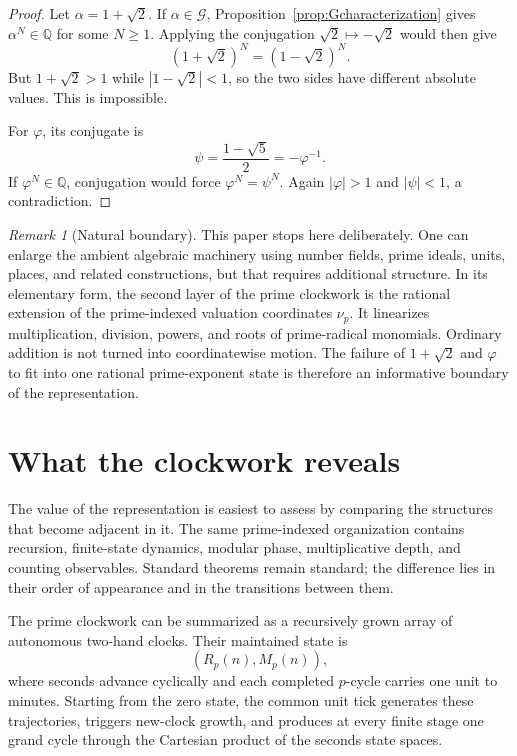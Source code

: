 \documentclass[11pt,a4paper]{article}
\theoremstyle{clockplain}
\theoremstyle{definition}
\theoremstyle{remark}
\newtheorem{remark}[proposition]{Remark}
\newcommand{\Q}{\mathbb Q}
\newcommand{\G}{\mathcal G}
\begin{document}
\begin{proof}
Let $\alpha=1+\sqrt2$. If $\alpha\in\G$, Proposition~\ref{prop:Gcharacterization} gives $\alpha^N\in\Q$ for some $N\ge1$. Applying the conjugation $\sqrt2\mapsto-\sqrt2$ would then give
\[
(1+\sqrt2)^N=(1-\sqrt2)^N.
\]
But $1+\sqrt2>1$ while $|1-\sqrt2|<1$, so the two sides have different absolute values. This is impossible.

For $\varphi$, its conjugate is
\[
\psi=\frac{1-\sqrt5}{2}=-\varphi^{-1}.
\]
If $\varphi^N\in\Q$, conjugation would force $\varphi^N=\psi^N$. Again $|\varphi|>1$ and $|\psi|<1$, a contradiction.
\end{proof}

\begin{remark}[Natural boundary]
This paper stops here deliberately. One can enlarge the ambient algebraic machinery using number fields, prime ideals, units, places, and related constructions, but that requires additional structure. In its elementary form, the second layer of the prime clockwork is the rational extension of the prime-indexed valuation coordinates $\nu_p$. It linearizes multiplication, division, powers, and roots of prime-radical monomials. Ordinary addition is not turned into coordinatewise motion. The failure of $1+\sqrt2$ and $\varphi$ to fit into one rational prime-exponent state is therefore an informative boundary of the representation.
\end{remark}

\section{What the clockwork reveals}

The value of the representation is easiest to assess by comparing the structures that become adjacent in it. The same prime-indexed organization contains recursion, finite-state dynamics, modular phase, multiplicative depth, and counting observables. Standard theorems remain standard; the difference lies in their order of appearance and in the transitions between them.

The prime clockwork can be summarized as a recursively grown array of autonomous two-hand clocks. Their maintained state is
\[
(R_p(n),M_p(n)),
\]
where seconds advance cyclically and each completed $p$-cycle carries one unit to minutes. Starting from the zero state, the common unit tick generates these trajectories, triggers new-clock growth, and produces at every finite stage one grand cycle through the Cartesian product of the seconds state spaces.
\end{document}
